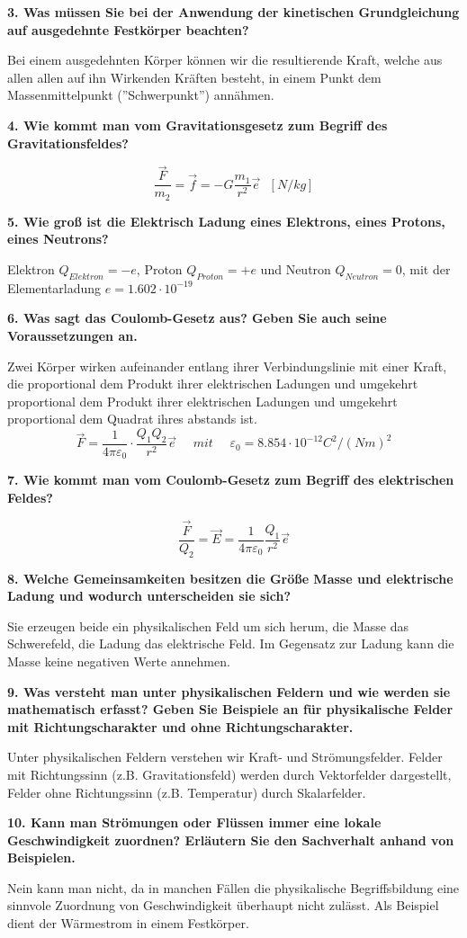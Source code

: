\documentclass[12pt,a4paper,twoside]{book}
\newcommand{\nqu}[1]{\vspace*{10mm} \noindent \textbf{#1} \par \vspace*{1mm}}
\begin{document}
\nqu{3. Was müssen Sie bei der Anwendung der kinetischen Grundgleichung auf ausgedehnte Festkörper beachten?}
Bei einem ausgedehnten Körper können wir die resultierende Kraft, welche aus allen allen auf ihn Wirkenden Kräften besteht, in einem Punkt dem Massenmittelpunkt (''Schwerpunkt'') annähmen.

\nqu{4. Wie kommt man vom Gravitationsgesetz zum Begriff des Gravitationsfeldes?}
\[\frac{\vec{F}}{m_2}=\vec{f}=-G\frac{m_1}{r^2}\vec{e}~~~[N/kg]\]

\nqu{5. Wie groß ist die Elektrisch Ladung eines Elektrons, eines Protons, eines Neutrons?}
Elektron $Q_{Elektron}=-e$, Proton $Q_{Proton}=+e$ und Neutron $Q_{Neutron}=0$, mit der Elementarladung $e=1.602\cdot 10^{-19}$

\nqu{6. Was sagt das Coulomb-Gesetz aus? Geben Sie auch seine Voraussetzungen an.}
Zwei Körper wirken aufeinander entlang ihrer Verbindungslinie mit einer Kraft, die proportional dem Produkt ihrer elektrischen Ladungen und umgekehrt proportional dem Produkt ihrer elektrischen Ladungen und umgekehrt proportional dem Quadrat ihres abstands ist. 
\[\vec{F}=\frac{1}{4\pi \varepsilon_0}\cdot \frac{Q_1Q_2}{r^2}\vec{e}~~~~~~ mit~~~~~~ \varepsilon_0 =8.854\cdot 10^{-12} C^2/(Nm)^2\]

\nqu{7. Wie kommt man vom Coulomb-Gesetz zum Begriff des elektrischen Feldes?}
\[\frac{\vec{F}}{Q_2}=\vec{E}=\frac{1}{4\pi \varepsilon_0}\frac{Q_1}{r^2}\vec{e}\]

\nqu{8. Welche Gemeinsamkeiten besitzen die Größe Masse und elektrische Ladung und wodurch unterscheiden sie sich?}
Sie erzeugen beide ein physikalischen Feld um sich herum, die Masse das Schwerefeld, die Ladung das elektrische Feld.
Im Gegensatz zur Ladung kann die Masse keine negativen Werte annehmen.

\nqu{9. Was versteht man unter physikalischen Feldern und wie werden sie mathematisch erfasst? Geben Sie Beispiele an für physikalische Felder mit Richtungscharakter und ohne Richtungscharakter.}
Unter physikalischen Feldern verstehen wir Kraft- und Strömungsfelder. Felder mit Richtungssinn (z.B. Gravitationsfeld) werden durch Vektorfelder dargestellt, Felder ohne Richtungssinn (z.B. Temperatur) durch Skalarfelder.

\nqu{10. Kann man Strömungen oder Flüssen immer eine lokale Geschwindigkeit zuordnen? Erläutern Sie den Sachverhalt anhand von Beispielen.}
Nein kann man nicht, da in manchen Fällen die physikalische Begriffsbildung eine sinnvole Zuordnung von Geschwindigkeit überhaupt nicht zulässt.
Als Beispiel dient der Wärmestrom in einem Festkörper.
\end{document}
